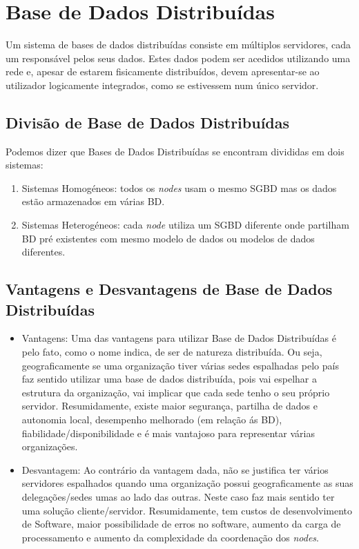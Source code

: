 \section{Base de Dados Distribuídas}
Um sistema de bases de dados distribuídas consiste em múltiplos servidores, cada um responsável pelos seus dados. Estes dados podem ser acedidos utilizando uma rede e, apesar de estarem fisicamente distribuídos, devem apresentar-se ao utilizador logicamente integrados, como se estivessem num único servidor. 

\subsection{Divisão de Base de Dados Distribuídas}
Podemos dizer que Bases de Dados Distribuídas se encontram divididas em dois sistemas:

\begin{enumerate}
    \item Sistemas Homogéneos: todos os \textit{nodes}  usam o mesmo \ac{SGBD} mas os dados estão armazenados em várias \ac{BD}.
    \item Sistemas Heterogéneos: cada \textit{node} utiliza um \ac{SGBD} diferente onde partilham \ac{BD} pré existentes com mesmo modelo de dados ou modelos de dados diferentes. 
\end{enumerate}

\subsection{Vantagens e Desvantagens de Base de Dados Distribuídas}
\begin{itemize}
    \item Vantagens: Uma das vantagens para utilizar Base de Dados Distribuídas é pelo fato, como o nome indica, de ser de natureza distribuída. Ou seja, geograficamente se uma organização tiver várias sedes espalhadas pelo país faz sentido utilizar uma base de dados distribuída, pois vai espelhar a estrutura da organização, vai implicar que cada sede tenho o seu próprio servidor.
    Resumidamente, existe maior segurança, partilha de dados e autonomia local, desempenho melhorado (em relação ás \ac{BD}), fiabilidade/disponibilidade e é mais vantajoso para representar várias organizações.
    \item Desvantagem: Ao contrário da vantagem dada, não se justifica ter vários servidores espalhados quando uma organização possui geograficamente as suas delegações/sedes umas ao lado das outras. Neste caso faz mais sentido ter uma solução cliente/servidor.
    Resumidamente, tem custos de desenvolvimento de Software, maior possibilidade de erros no software, aumento da carga de processamento e aumento da complexidade da coordenação dos \textit{nodes}.
\end{itemize}

